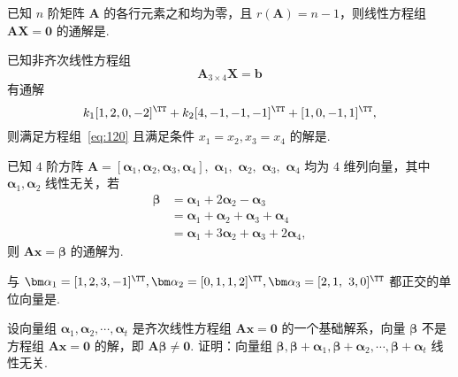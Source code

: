 	\begin{titwo}
		已知 $n$ 阶矩阵 $\bm A$ 的各行元素之和均为零，且 $r(\bm A) = n - 1$，则线性方程组 $\bm A \bm X = \bm 0$ 的通解是\htwo.
	\end{titwo}

	\begin{titwo}
		已知非齐次线性方程组
		\begin{equation}\label{eq:120}
			\bm A_{3 \times 4} \bm X = \bm b
		\end{equation}
		有通解
		\[
			k_{1} [1,2,0,-2]^{\TT} + k_{2} [4,-1,-1,-1]^{\TT} + [1,0,-1,1]^{\TT},
		\]
		则满足方程组~\eqref{eq:120} 且满足条件 $x_{1} = x_{2},x_{3} = x_{4}$ 的解是\htwo.
	\end{titwo}

	\begin{titwo}
		已知 $4$ 阶方阵 $\bm A = [\bm \alpha_{1},\bm \alpha_{2},\bm \alpha_{3},\bm \alpha_{4}],$ $\bm \alpha_{1},$ $\bm \alpha_{2},$ $\bm \alpha_{3},$ $\bm \alpha_{4}$ 均为 $4$ 维列向量，其中 $\bm \alpha_{1},\bm \alpha_{2}$ 线性无关，若
		\begin{align*}
			\bm \beta &= \bm \alpha_{1} + 2 \bm \alpha_{2} - \bm \alpha_{3} \\
			&= \bm \alpha_{1} + \bm \alpha_{2} + \bm \alpha_{3} + \bm \alpha_{4} \\
			&= \bm \alpha_{1} + 3 \bm \alpha_{2} + \bm \alpha_{3} + 2 \bm \alpha_{4},
		\end{align*}
		则 $\bm A \bm x = \bm \beta$ 的通解为\htwo.
	\end{titwo}

	\begin{titwo}
		与 $\bm \alpha_{1} = [1,2,3,-1]^{\TT}, \bm \alpha_{2} = [0,1,1,2]^{\TT}, \bm \alpha_{3} = [2,1,$ $3,0]^{\TT}$ 都正交的单位向量是\htwo.
	\end{titwo}

	\begin{titwo}
		设向量组 $\bm \alpha_{1},\bm \alpha_{2},\cdots,\bm \alpha_{t}$ 是齐次线性方程组 $\bm A \bm x = \bm 0$ 的一个基础解系，向量 $\bm \beta$ 不是方程组 $\bm A \bm x = \bm 0$ 的解，即 $\bm A \bm \beta \ne \bm 0$. 证明：向量组 $\bm \beta,\bm \beta + \bm \alpha_{1},\bm \beta + \bm \alpha_{2},\cdots,\bm \beta + \bm \alpha_{t}$ 线性无关. 
	\end{titwo}

